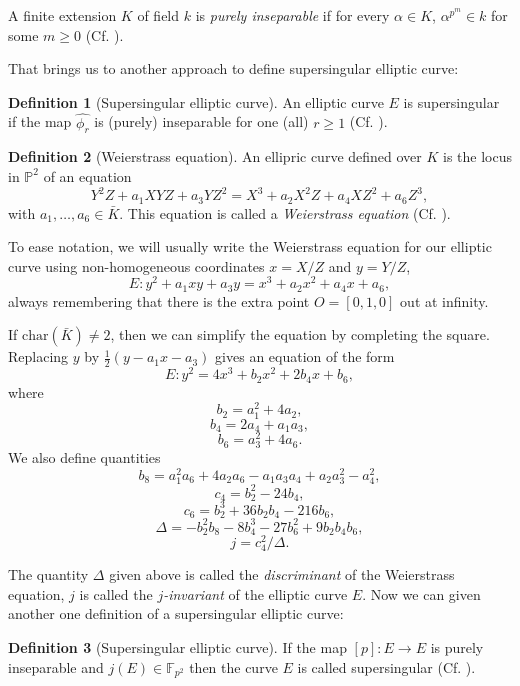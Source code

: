\documentclass{article}
\theoremstyle{theorem}
\theoremstyle{definition}
\newtheorem{definition}{Definition}
\begin{document}
A finite extension $K$ of field $k$ is \textit{purely inseparable} if for every $\alpha \in K$, $\alpha^{p^m} \in k$ for some $m \geq 0$ (Cf. \cite{PurelyInseparable}).
 
That brings us to another approach to define supersingular elliptic curve:
	\begin{definition}[Supersingular elliptic curve]
		An elliptic curve $E$ is supersingular if the map $\hat{\phi_r}$ is (purely) inseparable for one (all) $r \geq 1$ (Cf. \cite[V, \S3, Theorem 3.1]{Silverman}).
	\end{definition}

\begin{definition}[Weierstrass equation]\label{WE}
	An ellipric curve defined over $K$ is the locus in $\mathbb{P}^2$ of an equation
		\[ Y^2Z + a_1XYZ + a_3YZ^2 = X^3 + a_2X^2Z + a_4XZ^2 + a_6Z^3,  \]
	with $a_1,\dots, a_6 \in \bar{K}$. This equation is called a \textit{Weierstrass equation} (Cf. \cite[III, \S1]{Silverman}).
\end{definition} 

To ease notation, we will usually write the Weierstrass equation for our elliptic curve using non-homogeneous coordinates $x = X/Z$ and $y = Y/Z$, 
	\[ E: y^2 + a_1xy + a_3y = x^3 +a_2x^2 + a_4x +a_6, \]
always remembering that there is the extra point $O = [0, 1, 0]$ out at infinity. 

If $\mathrm{char}(\bar{K}) \neq 2$, then we can simplify the equation by completing the square. Replacing $y$ by $\frac{1}{2}(y - a_1x - a_3)$ gives an equation of the form
	\[E: y^2 = 4x^3 + b_2x^2 +2b_4x + b_6, \]
where
	\[b_2 = a_1^2 + 4a_2,\]
	\[b_4 = 2a_4 + a_1a_3,\]
	\[b_6 = a_3^2 + 4a_6.\]
We also define quantities
	\[b_8 = a_1^2a_6 + 4a_2a_6 - a_1a_3a_4 + a_2a_3^2 - a_4^2,\]
	\[c_4 = b_2^2 - 24b_4, \]
	\[c_6 = b_2^3 + 36b_2b_4 - 216b_6,\]
	\[\Delta = -b_2^2b_8 - 8b_4^3 - 27b_6^2 + 9b_2b_4b_6, \]
	\[j = c_4^2/\Delta.\]
	
The quantity $\Delta$ given above is called the \textit{discriminant} of the Weierstrass equation, $j$ is called the \textit{$j$-invariant} \label{j-invariant} of the elliptic curve $E$. Now we can given another one definition of a supersingular elliptic curve:
	\begin{definition}[Supersingular elliptic curve]
		If the map $[p]: E \to E$ is purely inseparable and $j(E) \in \mathbb{F}_{p^2}$ then the curve $E$ is called supersingular (Cf. \cite[V, \S3, Theorem 3.1]{Silverman}).
	\end{definition}
\end{document}
